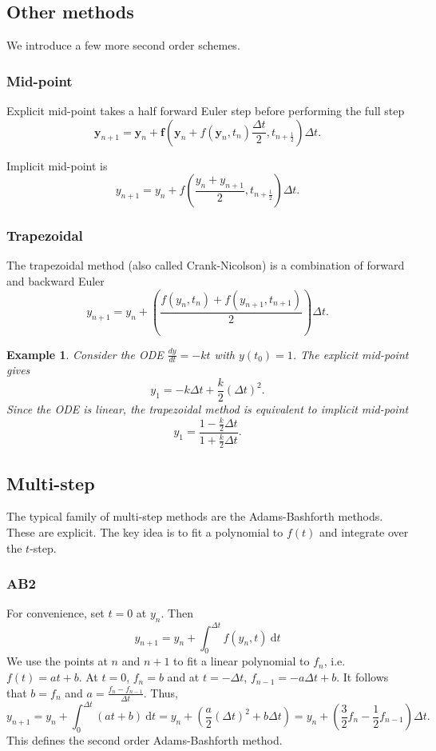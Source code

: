 \documentclass[11pt, a4paper]{article}
\theoremstyle{break}
\newtheorem{eg}[thm]{Example}
\newcommand*{\Paren}[1]{\left(#1\right)}%
\newcommand{\ve}{\mathbf} %
\newcommand{\dt}{\Delta t}
\newcommand{\dder}[2]{\frac{d #1}{d #2}}
\newcommand{\dd}{\ \mathrm{d}}
\begin{document}
\subsection{Other methods}
We introduce a few more second order schemes.
\subsubsection{Mid-point}
Explicit mid-point takes a half forward Euler step before performing the full step
\[\ve y_{n+1}=\ve y_n + \ve f\Paren{\ve y_n+f(\ve y_n,t_n)\frac{\dt}2,t_{n+\frac12}}\dt.\]

Implicit mid-point is \[y_{n+1}	=y_n+f\Paren{\frac{y_n+y_{n+1}}{2},t_{n+\frac12}}\dt.\]
\subsubsection{Trapezoidal}
The trapezoidal method (also called Crank-Nicolson) is a combination of forward and backward Euler \[y_{n+1}=y_n+\Paren{\frac{f(y_n,t_n)+f(y_{n+1},t_{n+1})}{2}}\dt.\]

\begin{eg}
Consider the ODE $\dder yt=-kt$ with $y(t_0)=1$. The explicit mid-point gives \[y_1=-k\dt+\frac{k}{2}(\dt)^2.\] Since the ODE is linear, the trapezoidal method is equivalent to implicit mid-point \[y_1=\frac{1-\frac k2\dt}{1+\frac k2\dt}.\]
\end{eg}

\subsection{Multi-step}
The typical family of multi-step methods are the Adams-Bashforth methods. These are explicit. The key idea is to fit a polynomial to $f(t)$ and integrate over the $t$-step.
\subsubsection{AB2}
For convenience, set $t=0$ at $y_n$. Then \[y_{n+1}=y_n+\int_0^{\dt} f(y_n,t)\dd t\]
 We use the points at $n$ and $n+1$ to fit a linear polynomial to $f_n$, i.e. $f(t)=at+b$. At $t=0$, $f_n=b$ and at $t=-\dt$, $f_{n-1}=-a\dt+b$. It follows that $b=f_n$ and $a=\frac{f_n-f_{n-1}}{\dt}$. Thus, \[y_{n+1}=y_n+\int_0^{\dt}(at+b)\dd t=y_n+\Paren{\frac{a}2(\dt)^2+b\dt}=y_n+\Paren{\frac32f_n-\frac12f_{n-1}}\dt.\]
 This defines the second order Adams-Bashforth method.
\end{document}
